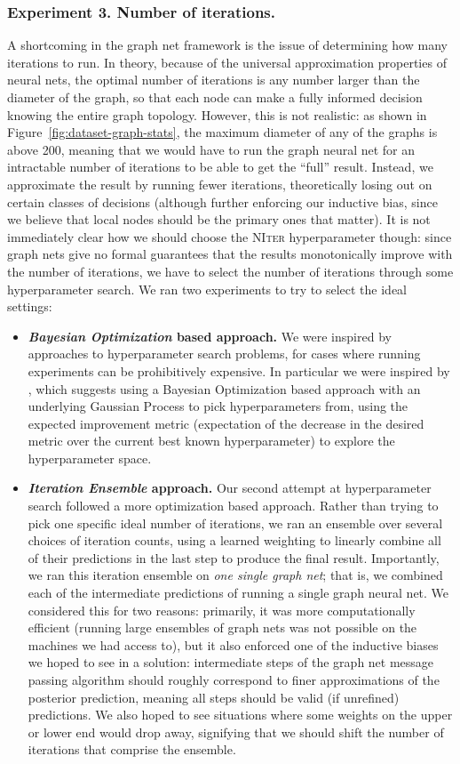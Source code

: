 \subsubsection{Experiment 3. Number of iterations.}
A shortcoming in the graph net framework is the issue of determining how many iterations to run.
In theory, because of the universal approximation properties of neural nets, the optimal number of iterations is any number larger than the diameter of the graph, so that each node can make a fully informed decision knowing the entire graph topology.
However, this is not realistic: as shown in Figure~\ref{fig:dataset-graph-stats}, the maximum diameter of any of the graphs is above 200, meaning that we would have to run the graph neural net for an intractable number of iterations to be able to get the ``full'' result.
Instead, we approximate the result by running fewer iterations, theoretically losing out on certain classes of decisions (although further enforcing our inductive bias, since we believe that local nodes should be the primary ones that matter).
It is not immediately clear how we should choose the \textsc{NIter} hyperparameter though: since graph nets give no formal guarantees that the results monotonically improve with the number of iterations, we have to select the number of iterations through some hyperparameter search.
We ran two experiments to try to select the ideal settings: 
\begin{itemize}
	\item \textbf{\emph{Bayesian Optimization} based approach.} 
	We were inspired by approaches to hyperparameter search problems, for cases where running experiments can be prohibitively expensive. In particular we were inspired by \cite{snoek2012practical}, which suggests using a Bayesian Optimization based approach with an underlying Gaussian Process to pick hyperparameters from, using the expected improvement metric (expectation of the decrease in the desired metric over the current best known hyperparameter) to explore the hyperparameter space.
	\item \textbf{\emph{Iteration Ensemble} approach.} Our second attempt at hyperparameter search followed a more optimization based approach.
	Rather than trying to pick one specific ideal number of iterations, we ran an ensemble over several choices of iteration counts, using a learned weighting to linearly combine all of their predictions in the last step to produce the final result.
	Importantly, we ran this iteration ensemble on \emph{one single graph net}; that is, we combined each of the intermediate predictions of running a single graph neural net.
	We considered this for two reasons: primarily, it was more computationally efficient (running large ensembles of graph nets was not possible on the machines we had access to), but it also enforced one of the inductive biases we hoped to see in a solution: intermediate steps of the graph net message passing algorithm should roughly correspond to finer approximations of the posterior prediction, meaning all steps should be valid (if unrefined) predictions. We also hoped to see situations where some weights on the upper or lower end would drop away, signifying that we should shift the number of iterations that comprise the ensemble.
\end{itemize}